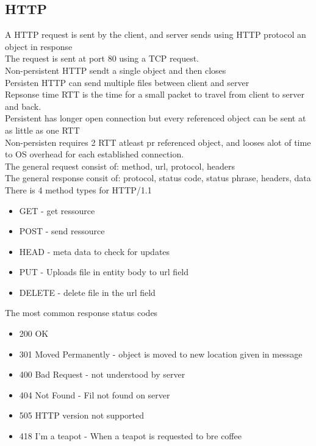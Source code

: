 \documentclass[12pt, a4paper]{article}
\begin{document}
		\subsection{HTTP}
			A HTTP request is sent by the client, and server sends using HTTP protocol an object in response\\
			The request is sent at port 80 using a TCP request.\\
			Non-persistent HTTP sendt a single object and then closes\\
			Persisten HTTP can send multiple files between client and server\\
			Repsonse time RTT is the time for a small packet to travel from client to server and back.\\
			Persistent has longer open connection but every referenced object can be sent at as little as one RTT\\
			Non-persisten requires 2 RTT atleast pr referenced object, and looses alot of time to OS overhead for each established connection.\\[4mm]
			The general request consist of: method, url, protocol, headers\\
			The general response consit of: protocol, status code, status phrase, headers, data\\
			There is 4 method types for HTTP/1.1
			\begin{itemize}
				\item GET - get ressource
				\item POST - send ressource
				\item HEAD - meta data to check for updates
				\item PUT - Uploads file in entity body to url field
				\item DELETE - delete file in the url field
			\end{itemize}
			The most common response status codes
			\begin{itemize}
				\item 200 OK
				\item 301 Moved Permanently - object is moved to new location given in message
				\item 400 Bad Request - not understood by server
				\item 404 Not Found - Fil not found on server
				\item 505 HTTP version not supported 
				\item 418 I'm a teapot - When a teapot is requested to bre coffee
			\end{itemize}
\end{document}
